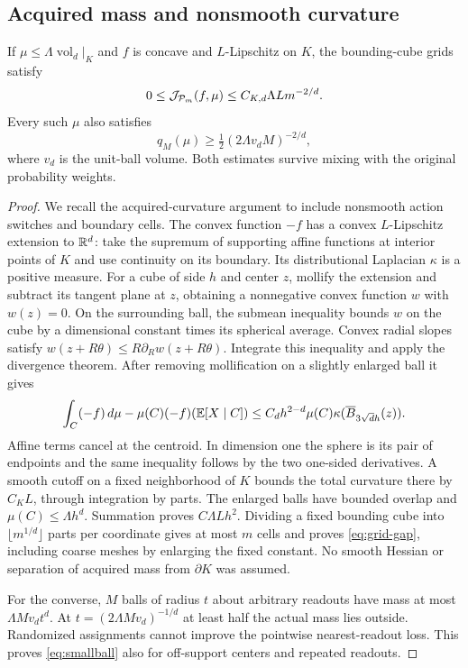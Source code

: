 \subsection{Acquired mass and nonsmooth curvature}
\begin{lemma}\label{lem:geometry}
If $\mu\le\Lambda\operatorname{vol}_d|_K$ and $f$ is concave and $L$-Lipschitz on $K$, the bounding-cube grids satisfy
\begin{equation}\label{eq:grid-gap}
 0\le\mathcal J_{\mathcal P_m}(f,\mu)\le C_{K,d}\Lambda Lm^{-2/d}.
\end{equation}
Every such $\mu$ also satisfies
\begin{equation}\label{eq:smallball}
 q_M(\mu)\ge\tfrac12(2\Lambda v_dM)^{-2/d},
\end{equation}
where $v_d$ is the unit-ball volume. Both estimates survive mixing with the original probability weights.
\end{lemma}
\begin{proof}
We recall the acquired-curvature argument to include nonsmooth action switches and boundary cells. The convex function $-f$ has a convex $L$-Lipschitz extension to $\mathbb R^d$: take the supremum of supporting affine functions at interior points of $K$ and use continuity on its boundary. Its distributional Laplacian $\kappa$ is a positive measure. For a cube of side $h$ and center $z$, mollify the extension and subtract its tangent plane at $z$, obtaining a nonnegative convex function $w$ with $w(z)=0$. On the surrounding ball, the submean inequality bounds $w$ on the cube by a dimensional constant times its spherical average. Convex radial slopes satisfy $w(z+R\theta)\le R\partial_Rw(z+R\theta)$. Integrate this inequality and apply the divergence theorem. After removing mollification on a slightly enlarged ball it gives
\[
 \int_C(-f)\,d\mu-\mu(C)(-f)(\mathbb E[X\mid C])
 \le C_dh^{2-d}\mu(C)\kappa(\overline B_{3\sqrt d h}(z)).
\]
Affine terms cancel at the centroid. In dimension one the sphere is its pair of endpoints and the same inequality follows by the two one-sided derivatives. A smooth cutoff on a fixed neighborhood of $K$ bounds the total curvature there by $C_KL$, through integration by parts. The enlarged balls have bounded overlap and $\mu(C)\le\Lambda h^d$. Summation proves $C\Lambda Lh^2$. Dividing a fixed bounding cube into $\lfloor m^{1/d}\rfloor$ parts per coordinate gives at most $m$ cells and proves \eqref{eq:grid-gap}, including coarse meshes by enlarging the fixed constant. No smooth Hessian or separation of acquired mass from $\partial K$ was assumed.

For the converse, $M$ balls of radius $t$ about arbitrary readouts have mass at most $\Lambda Mv_dt^d$. At $t=(2\Lambda Mv_d)^{-1/d}$ at least half the actual mass lies outside. Randomized assignments cannot improve the pointwise nearest-readout loss. This proves \eqref{eq:smallball} also for off-support centers and repeated readouts.
\end{proof}

